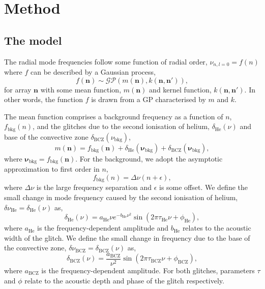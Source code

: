 \documentclass[linenumbers,modern]{aastex631}
\newcommand{\helium}{\mathrm{He}}
\newcommand{\bcz}{\mathrm{BCZ}}
\newcommand{\bkg}{\mathrm{bkg}}
\begin{document}
\section{Method} \label{sec:method}

\subsection{The model} \label{sec:model}

The radial mode frequencies follow some function of radial order, \(\nu_{n,l=0}
= f(n)\) where \(f\) can be described by a Gaussian process,
%
\begin{equation}
    f(\bm n) \sim \mathcal{GP}\left(m(\bm n), k(\bm n, \bm n')\right),
\end{equation}
%
for array \(\bm n\) with some mean function, \(m(\bm n)\) and kernel function,
\(k(\bm n, \bm n')\). In other words, the function \(f\) is drawn from a GP
characterised by \(m\) and \(k\).

The mean function comprises a background frequency as a function of \(n\),
\(f_\bkg(n)\), and the glitches due to the second ionisation of helium,
\(\delta_\helium(\nu)\) and base of the convective zone
\(\delta_\bcz(\nu_\bkg)\),
%
\begin{equation}
    m(\bm n) = f_\bkg(\bm n) + \delta_\helium(\bm\nu_\bkg) +
    \delta_\bcz(\bm\nu_\bkg),
\end{equation}
%
where \(\bm\nu_\bkg = f_\bkg(\bm n)\). For the background, we adopt the
asymptotic approximation to first order in \(n\),
%
\begin{equation}
    f_\bkg(n) = \Delta\nu (n + \epsilon),
\end{equation}
%
where \(\Delta\nu\) is the large frequency separation and \(\epsilon\) is some
offset. We define the small change in mode frequency caused by the second
ionisation of helium, \(\delta\nu_\helium = \delta_\helium(\nu)\) as,
%
\begin{equation}
    \delta_\helium(\nu) = a_\helium \nu e^{- b_\helium \nu^2}
    \sin\left( 2 \pi \tau_\helium \nu + \phi_\helium \right),
\end{equation}
%
where \(a_\helium\) is the frequency-dependent amplitude and \(b_\helium\)
relates to the acoustic width of the glitch. We define the small change in
frequency due to the base of the convective zone,
\(\delta\nu_\bcz = \delta_\bcz(\nu)\) as,
%
\begin{equation}
    \delta_\bcz(\nu) = \frac{a_\bcz}{\nu^2}
    \sin\left( 2 \pi \tau_\bcz \nu + \phi_\bcz \right),
\end{equation}
%
where \(a_\bcz\) is the frequency-dependent amplitude. For both glitches,
parameters \(\tau\) and \(\phi\) relate to the acoustic depth and phase of
the glitch respectively.
\end{document}
